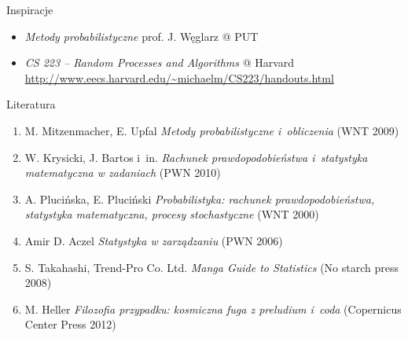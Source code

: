 \documentclass{beamer}
\begin{document}
\begin{frame}{Inspiracje}
\begin{itemize}
\item \emph{Metody probabilistyczne} prof. J. Węglarz @ PUT
\item \emph{CS 223 -- Random Processes and Algorithms} @ Harvard \\
\url{http://www.eecs.harvard.edu/~michaelm/CS223/handouts.html}
\end{itemize}
\end{frame}
\begin{frame}{Literatura}
\begin{enumerate}
\item M. Mitzenmacher, E. Upfal \emph{Metody probabilistyczne i~obliczenia} (WNT 2009)
\item W. Krysicki, J. Bartos i~in. \emph{Rachunek prawdopodobieństwa i~statystyka matematyczna w zadaniach} (PWN 2010)
\item A. Plucińska, E. Pluciński \emph{Probabilistyka: rachunek prawdopodobieństwa, statystyka matematyczna, procesy stochastyczne} (WNT 2000)
\item Amir D. Aczel \emph{Statystyka w zarządzaniu} (PWN 2006)
\item S. Takahashi, Trend-Pro Co. Ltd. \emph{Manga Guide to Statistics} (No starch press 2008)
\item M. Heller \emph{Filozofia przypadku: kosmiczna fuga z preludium i~coda} (Copernicus Center Press 2012)
\end{enumerate}
\end{frame}
\end{document}
